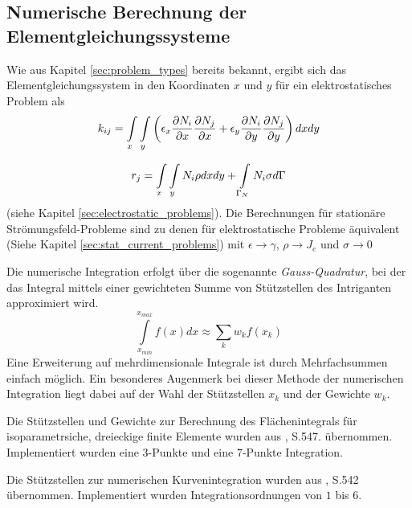 \subsection{Numerische Berechnung der Elementgleichungssysteme}
\label{sec:equation_system_calculation}

Wie aus Kapitel \ref{sec:problem_types} bereits bekannt, ergibt sich das Elementgleichungssystem in den Koordinaten $x$ und $y$ für ein elektrostatisches Problem als
\begin{equation}
\label{eq:k_ij_e_static_2}
k_{ij} = \int\displaylimits_{x} \int\displaylimits_{y} \left(\epsilon_x \frac{\partial N_i}{\partial x}\frac{\partial N_j}{\partial x} +  \epsilon_y\frac{\partial N_i}{\partial y}\frac{\partial N_j}{\partial y}\right)dx dy
\end{equation}

\begin{equation}
\label{eq:right_side_e_static_2}
r_j = \int\displaylimits_{x} \int\displaylimits_{y} N_i \rho dx dy + \int\displaylimits_{\Gamma_N} N_i\sigma d\Gamma
\end{equation} 
(siehe Kapitel \ref{sec:electrostatic_problems}). Die Berechnungen für stationäre Strömungsfeld-Probleme sind zu denen für elektrostatische Probleme äquivalent (Siehe Kapitel \ref{sec:stat_current_problems}) mit $\epsilon \rightarrow \gamma$, $\rho \rightarrow J_e$ und $\sigma \rightarrow 0$\newline

Die numerische Integration erfolgt über die sogenannte \textit{Gauss-Quadratur}, bei der das Integral mittels einer gewichteten Summe von Stützstellen des Intriganten approximiert wird.
\begin{equation}
\int\limits_{x_{min}}^{x_{max}} f(x) dx \approx \sum\limits_{k}w_kf(x_k)
\end{equation}
Eine Erweiterung auf mehrdimensionale Integrale ist durch Mehrfachsummen einfach möglich. Ein besonderes Augenmerk bei dieser Methode der numerischen Integration liegt dabei auf der Wahl der Stützstellen $x_k$ und der Gewichte $w_k$. 


Die Stützstellen und Gewichte zur Berechnung des Flächenintegrals für isoparametrsiche, dreieckige finite Elemente wurden aus \cite{bathe}, S.547. übernommen. Implementiert wurden eine 3-Punkte und eine 7-Punkte Integration.\newline

Die Stützstellen zur numerischen Kurvenintegration wurden aus \cite{bathe}, S.542 übernommen. Implementiert wurden Integrationsordnungen von $1$ bis $6$.


